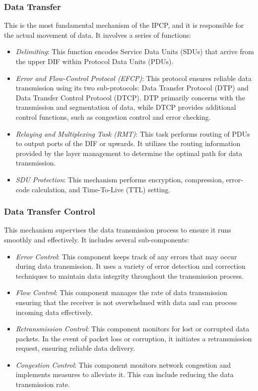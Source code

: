 \documentclass{ieeeaccess}
\begin{document}
\subsubsection{Data Transfer}
This is the most fundamental mechanism of the IPCP, and it is responsible for the actual movement of data. It involves a series of functions:
\begin{itemize}
	\item \textit{Delimiting}: This function encodes Service Data Units (SDUs) that arrive from the upper DIF within Protocol Data Units (PDUs).
	\item \textit{Error and Flow-Control Protocol (EFCP)}: This protocol ensures reliable data transmission using its two sub-protocols: Data Transfer Protocol (DTP) and Data Transfer Control Protocol (DTCP). DTP primarily concerns with the transmission and segmentation of data, while DTCP provides additional control functions, such as congestion control and error checking.
	\item \textit{Relaying and Multiplexing Task (RMT)}: This task performs routing of PDUs to output ports of the DIF or upwards. It utilizes the routing information provided by the layer management to determine the optimal path for data transmission.
	\item \textit{SDU Protection}: This mechanism performs encryption, compression, error-code calculation, and Time-To-Live (TTL) setting.
\end{itemize}

\subsubsection{Data Transfer Control} 
This mechanism supervises the data transmission process to ensure it runs smoothly and effectively. It includes several sub-components:
\begin{itemize}
	\item \textit{Error Control}: This component keeps track of any errors that may occur during data transmission. It uses a variety of error detection and correction techniques to maintain data integrity throughout the transmission process.
	\item \textit{Flow Control}: This component manages the rate of data transmission ensuring that the receiver is not overwhelmed with data and can process incoming data effectively.
	\item \textit{Retransmission Control}: This component monitors for lost or corrupted data packets. In the event of packet loss or corruption, it initiates a retransmission request, ensuring reliable data delivery.
	\item \textit{Congestion Control}: This component monitors network congestion and implements measures to alleviate it. This can include reducing the data transmission rate.
\end{itemize}
\end{document}
